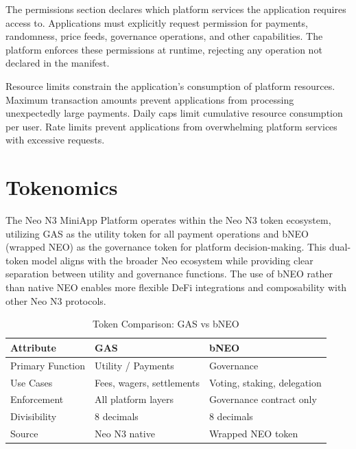 \documentclass[11pt,a4paper]{article}
\begin{document}
The permissions section declares which platform services the application requires access to. Applications must explicitly request permission for payments, randomness, price feeds, governance operations, and other capabilities. The platform enforces these permissions at runtime, rejecting any operation not declared in the manifest.

Resource limits constrain the application's consumption of platform resources. Maximum transaction amounts prevent applications from processing unexpectedly large payments. Daily caps limit cumulative resource consumption per user. Rate limits prevent applications from overwhelming platform services with excessive requests.

\newpage
\section{Tokenomics}

The Neo N3 MiniApp Platform operates within the Neo N3 token ecosystem, utilizing GAS as the utility token for all payment operations and bNEO (wrapped NEO) as the governance token for platform decision-making. This dual-token model aligns with the broader Neo ecosystem while providing clear separation between utility and governance functions. The use of bNEO rather than native NEO enables more flexible DeFi integrations and composability with other Neo N3 protocols.

\begin{table}[h]
\centering
\caption{Token Comparison: GAS vs bNEO}
\begin{tabular}{@{}lll@{}}
\toprule
\textbf{Attribute} & \textbf{GAS} & \textbf{bNEO} \\
\midrule
Primary Function & Utility / Payments & Governance \\
Use Cases & Fees, wagers, settlements & Voting, staking, delegation \\
Enforcement & All platform layers & Governance contract only \\
Divisibility & 8 decimals & 8 decimals \\
Source & Neo N3 native & Wrapped NEO token \\
\bottomrule
\end{tabular}
\label{tab:token-comparison}
\end{table}
\end{document}
